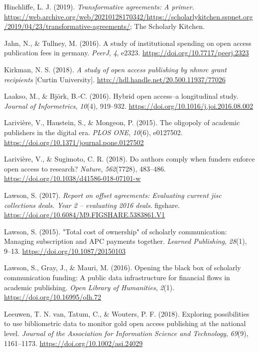 \documentclass[a4paper,man,floatsintext,longtable,noextraspace,12pt]{apa6}
\newlength{\cslhangindent}
\newenvironment{cslreferences}%
  {\setlength{\parindent}{0pt}%
  \everypar{\setlength{\hangindent}{\cslhangindent}}\ignorespaces}%
  {\par}
\begin{document}
\begin{cslreferences}
\leavevmode\hypertarget{ref-Hinchliffe_2019}{}%
Hinchliffe, L. J. (2019). \emph{Transformative agreements: A primer}.
\url{https://web.archive.org/web/20210128170342/https://scholarlykitchen.sspnet.org/2019/04/23/transformative-agreements/};
The Scholarly Kitchen.

\leavevmode\hypertarget{ref-Jahn_2016}{}%
Jahn, N., \& Tullney, M. (2016). A study of institutional spending on
open access publication fees in germany. \emph{PeerJ}, \emph{4}, e2323.
\url{https://doi.org/10.7717/peerj.2323}

\leavevmode\hypertarget{ref-Kirkman_2018}{}%
Kirkman, N. S. (2018). \emph{A study of open access publishing by nhmrc
grant recipients} {[}Curtin University{]}.
\url{http://hdl.handle.net/20.500.11937/77026}

\leavevmode\hypertarget{ref-Laakso_2016}{}%
Laakso, M., \& Björk, B.-C. (2016). Hybrid open access--a longitudinal
study. \emph{Journal of Informetrics}, \emph{10}(4), 919--932.
\url{https://doi.org/10.1016/j.joi.2016.08.002}

\leavevmode\hypertarget{ref-Larivi_re_2015}{}%
Larivière, V., Haustein, S., \& Mongeon, P. (2015). The oligopoly of
academic publishers in the digital era. \emph{PLOS ONE}, \emph{10}(6),
e0127502. \url{https://doi.org/10.1371/journal.pone.0127502}

\leavevmode\hypertarget{ref-Larivi_re_2018}{}%
Larivière, V., \& Sugimoto, C. R. (2018). Do authors comply when funders
enforce open access to research? \emph{Nature}, \emph{562}(7728),
483--486. \url{https://doi.org/10.1038/d41586-018-07101-w}

\leavevmode\hypertarget{ref-Lawson_2018}{}%
Lawson, S. (2017). \emph{Report on offset agreements: Evaluating current
jisc collections deals. Year 2 -- evaluating 2016 deals}. figshare.
\url{https://doi.org/10.6084/M9.FIGSHARE.5383861.V1}

\leavevmode\hypertarget{ref-Lawson_2015}{}%
Lawson, S. (2015). "Total cost of ownership" of scholarly communication:
Managing subscription and APC payments together. \emph{Learned
Publishing}, \emph{28}(1), 9--13. \url{https://doi.org/10.1087/20150103}

\leavevmode\hypertarget{ref-Lawson_2016}{}%
Lawson, S., Gray, J., \& Mauri, M. (2016). Opening the black box of
scholarly communication funding: A public data infrastructure for
financial flows in academic publishing. \emph{Open Library of
Humanities}, \emph{2}(1). \url{https://doi.org/10.16995/olh.72}

\leavevmode\hypertarget{ref-van_Leeuwen_2018}{}%
Leeuwen, T. N. van, Tatum, C., \& Wouters, P. F. (2018). Exploring
possibilities to use bibliometric data to monitor gold open access
publishing at the national level. \emph{Journal of the Association for
Information Science and Technology}, \emph{69}(9), 1161--1173.
\url{https://doi.org/10.1002/asi.24029}


\end{cslreferences}
\end{document}
